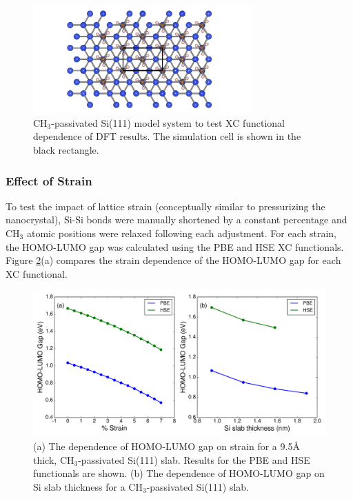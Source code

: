 \begin{figure}
\begin{center}
\includegraphics[width=0.75\textwidth]{./appendixD/sidft1.png}
\caption[CH$_3$-passivated Si(111) model system to test XC functional dependence of DFT results.]{CH$_3$-passivated Si(111) model system to test XC functional dependence of DFT results. The simulation cell is shown in the black rectangle.}
\label{f:sidft1}
\end{center}
\end{figure}

\subsubsection{Effect of Strain} To test the impact of lattice strain (conceptually similar to pressurizing the nanocrystal), Si-Si bonds were manually shortened by a constant percentage and CH$_3$ atomic positions were relaxed following each adjustment. For each strain, the HOMO-LUMO gap was calculated using the PBE and HSE XC functionals. Figure \ref{f:sidft2}(a) compares the strain dependence of the HOMO-LUMO gap for each XC functional.

\begin{figure}
\begin{center}
\includegraphics[width=\textwidth]{./appendixD/sidft2.pdf}
\caption[Comparison of XC functionals for modeling strain and size dependence of NC electronic structure.]{(a) The dependence of HOMO-LUMO gap on strain for a 9.5\r{A} thick, CH$_3$-passivated Si(111) slab.  Results for the PBE and HSE functionals are shown. (b) The dependence of HOMO-LUMO gap on Si slab thickness for a CH$_3$-passivated Si(111) slab.}
\label{f:sidft2}
\end{center}
\end{figure}

